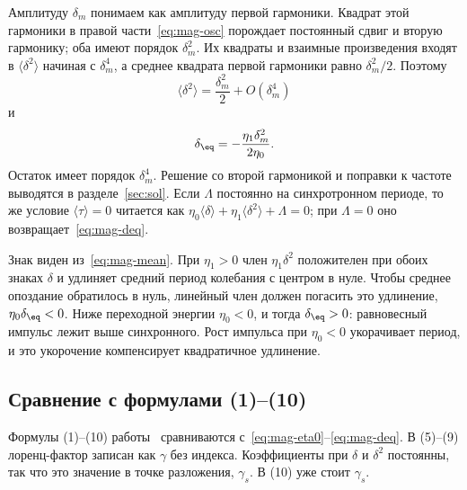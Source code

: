Амплитуду $\delta_m$ понимаем как амплитуду первой гармоники. Квадрат этой гармоники в правой части~\eqref{eq:mag-osc} порождает постоянный сдвиг и вторую гармонику; оба имеют порядок $\delta_m^2$. Их квадраты и взаимные произведения входят в $\langle\delta^2\rangle$ начиная с $\delta_m^4$, а среднее квадрата первой гармоники равно $\delta_m^2/2$. Поэтому
\begin{equation}
\label{eq:mag-d2}
\langle\delta^2\rangle=\frac{\delta_m^2}{2}+O(\delta_m^4)
\end{equation}
и
\begin{equation}
\label{eq:mag-deq}
\delta_\eq=-\frac{\eta_1\delta_m^2}{2\eta_0}.
\end{equation}
Остаток имеет порядок $\delta_m^4$. Решение со второй гармоникой и поправки к частоте выводятся в разделе~\ref{sec:sol}. Если $\Lambda$ постоянно на синхротронном периоде, то же условие $\langle\tau\rangle=0$ читается как $\eta_0\langle\delta\rangle+\eta_1\langle\delta^2\rangle+\Lambda=0$; при $\Lambda=0$ оно возвращает~\eqref{eq:mag-deq}.

Знак виден из~\eqref{eq:mag-mean}. При $\eta_1>0$ член $\eta_1\delta^2$ положителен при обоих знаках $\delta$ и удлиняет средний период колебания с центром в нуле. Чтобы среднее опоздание обратилось в нуль, линейный член должен погасить это удлинение, $\eta_0\delta_\eq<0$. Ниже переходной энергии $\eta_0<0$, и тогда $\delta_\eq>0$: равновесный импульс лежит выше синхронного. Рост импульса при $\eta_0<0$ укорачивает период, и это укорочение компенсирует квадратичное удлинение.

\subsection{Сравнение с формулами (1)--(10)}

Формулы (1)--(10) работы~\cite{Senichev2013} сравниваются с~\eqref{eq:mag-eta0}--\eqref{eq:mag-deq}. В (5)--(9) лоренц-фактор записан как $\gamma$ без индекса. Коэффициенты при $\delta$ и $\delta^2$ постоянны, так что это значение в точке разложения, $\gamma_s$. В (10) уже стоит $\gamma_s$.

